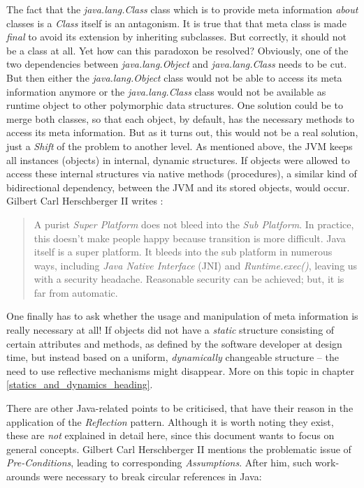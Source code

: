 The fact that the \emph{java.lang.Class} class which is to provide meta
information \emph{about} classes is a \emph{Class} itself is an antagonism. It
is true that that meta class is made \emph{final} to avoid its extension by
inheriting subclasses. But correctly, it should not be a class at all. Yet how
can this paradoxon be resolved? Obviously, one of the two dependencies between
\emph{java.lang.Object} and \emph{java.lang.Class} needs to be cut. But then
either the \emph{java.lang.Object} class would not be able to access its meta
information anymore or the \emph{java.lang.Class} class would not be available
as runtime object to other polymorphic data structures. One solution could be
to merge both classes, so that each object, by default, has the necessary
methods to access its meta information. But as it turns out, this would not be
a real solution, just a \emph{Shift} of the problem to another level. As
mentioned above, the JVM keeps all instances (objects) in internal, dynamic
structures. If objects were allowed to access these internal structures via
native methods (procedures), a similar kind of bidirectional dependency,
between the JVM and its stored objects, would occur. Gilbert Carl Herschberger
II writes \cite{josgeneral}:

\begin{quote}
    A purist \emph{Super Platform} does not bleed into the \emph{Sub Platform}.
    In practice, this doesn't make people happy because transition is more
    difficult. Java itself is a super platform. It bleeds into the sub platform
    in numerous ways, including \emph{Java Native Interface} (JNI) and
    \emph{Runtime.exec()}, leaving us with a security headache. Reasonable
    security can be achieved; but, it is far from automatic.
\end{quote}

One finally has to ask whether the usage and manipulation of meta information is
really necessary at all! If objects did not have a \emph{static} structure
consisting of certain attributes and methods, as defined by the software
developer at design time, but instead based on a uniform, \emph{dynamically}
changeable structure -- the need to use reflective mechanisms might disappear.
More on this topic in chapter \ref{statics_and_dynamics_heading}.

There are other Java-related points to be criticised, that have their reason in
the application of the \emph{Reflection} pattern. Although it is worth noting
they exist, these are \emph{not} explained in detail here, since this document
wants to focus on general concepts. Gilbert Carl Herschberger II
\cite{josgeneral} mentions the problematic issue of \emph{Pre-Conditions},
leading to corresponding \emph{Assumptions}. After him, such work-arounds were
necessary to break circular references in Java:

